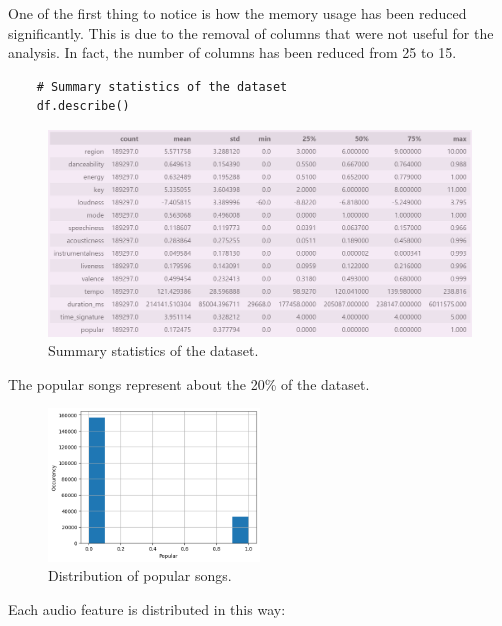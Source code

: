     One of the first thing to notice is how the memory usage has been reduced significantly. This is due to the removal of columns that were not useful for the analysis. In fact, the number of columns has been reduced from 25 to 15.
    
    \newpage
    \begin{verbatim}
    # Summary statistics of the dataset
    df.describe()
    \end{verbatim}
    
    
    \begin{figure}[h]
        \centering
        \includegraphics[width=1.1\textwidth]{media/describe_cleaned.png} 
        \caption{Summary statistics of the dataset.}
        \label{df.describe()}
    \end{figure}

The popular songs represent about the 20\% of the dataset.

    \begin{figure}[h]
        \centering
        \includegraphics[width=0.5\textwidth]{media/popular_dist_cleaned.png} 
        \caption{Distribution of popular songs.}
        \label{popular_songs}
    \end{figure}

\newpage

Each audio feature is distributed in this way: 

